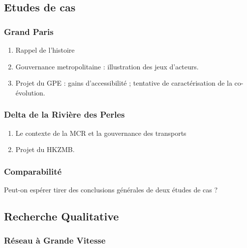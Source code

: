 \subsection{Etudes de cas}


\subsubsection{Grand Paris}

\begin{enumerate}
	\item Rappel de l'histoire
	\item Gouvernance metropolitaine : illustration des jeux d'acteurs.
	\item Projet du GPE : gains d'accessibilité ; tentative de caractérisation de la co-évolution.
\end{enumerate}





\subsubsection{Delta de la Rivière des Perles}


\begin{enumerate}
	\item Le contexte de la MCR et la gouvernance des transports
	\item Projet du HKZMB.
\end{enumerate}

\subsubsection{Comparabilité}

Peut-on espérer tirer des conclusions générales de deux études de cas ?




\subsection{Recherche Qualitative}

\subsubsection{Réseau à Grande Vitesse}

